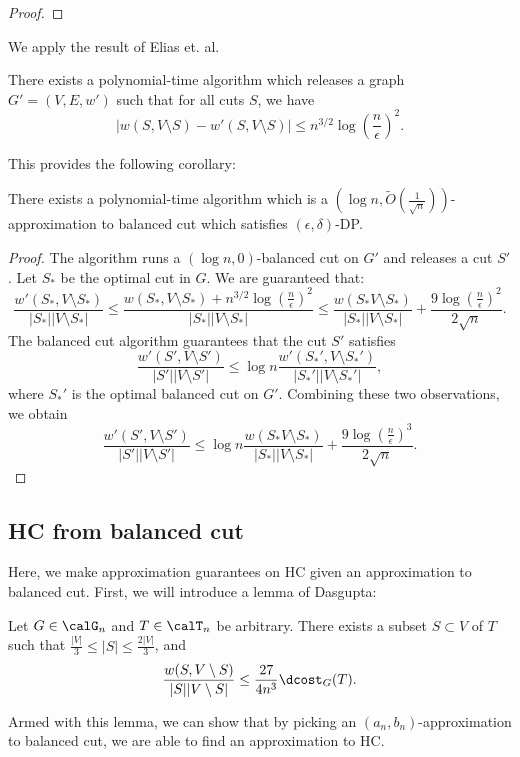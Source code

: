 \begin{proof}
\end{proof}

We apply the result of Elias et. al.
\begin{prop}
    There exists a polynomial-time algorithm which releases a graph $G' = (V, E, w')$ such that for all cuts $S$, we have
    \[
        |w(S, V \setminus S) - w'(S, V \setminus S) | \leq n^{3/2}\log(\frac{n}{\epsilon})^2.
    \]
\end{prop}
This provides the following corollary:
\begin{coro}
There exists a polynomial-time algorithm which is a $(\log n, \tilde{O}(\frac{1}{\sqrt{n}}))$-approximation to balanced cut which satisfies $(\epsilon, \delta)$-DP.
\end{coro}
\begin{proof}
The algorithm runs a $(\log n, 0)$-balanced cut on $G'$ and releases a cut $S'$. Let $S_*$ be the optimal cut in $G$. We are guaranteed that:
\[
    \frac{w'(S_*, V \setminus S_*)}{|S_*| |V \setminus S_*|} \leq \frac{w(S_*, V \setminus S_*) + n^{3/2} \log (\frac{n}{\epsilon})^2}{|S_*| |V \setminus S_*|} \leq \frac{w(S_* V \setminus S_*)}{|S_*||V \setminus S_*|} + \frac{9 \log(\frac{n}{\epsilon})^2}{2\sqrt{n}}.
\]
The balanced cut algorithm guarantees that the cut $S'$ satisfies
\[
\frac{w'(S', V \setminus S')}{|S'| |V \setminus S'|} \leq \log n \frac{w'(S_*', V \setminus S_*')}{|S_*'||V \setminus S_*'|},
\]
where $S_*'$ is the optimal balanced cut on $G'$. Combining these two observations, we obtain
\[
    \frac{w'(S', V \setminus S')}{|S'| |V \setminus S'|} \leq \log n \frac{w(S_* V \setminus S_*)}{|S_*||V \setminus S_*|} + \frac{9 \log(\frac{n}{\epsilon})^3}{2\sqrt{n}}.
\]
\end{proof}

\subsection{HC from balanced cut}
Here, we make approximation guarantees on HC given an approximation to balanced cut. First, we will introduce a lemma of Dasgupta:

\begin{lem}
Let $G \in \calG_n$ and $T \in \calT_n$ be arbitrary. There exists a subset $S \subset V$ of $T$ such that $\frac{|V|}{3} \leq |S| \leq \frac{2|V|}{3}$, and
\[
    \frac{w(S, V \setminus S)}{|S||V \setminus S|} \leq \frac{27}{4n^3} \dcost_G(T).
\]
\end{lem}

Armed with this lemma, we can show that by picking an $(a_n, b_n)$-approximation to balanced cut, we are able to find an approximation to HC.


